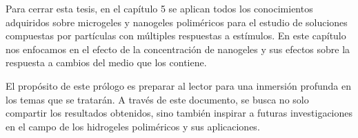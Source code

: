 Para cerrar esta tesis, en el cap\'itulo 5 se aplican todos los conocimientos adquiridos sobre microgeles y nanogeles polim\'ericos para el estudio de soluciones compuestas por part\'iculas con m\'ultiples respuestas a est\'imulos. En este cap\'itulo nos enfocamos en el efecto de la concentraci\'on de nanogeles y sus efectos sobre la respuesta a cambios del medio que los contiene.

El prop\'osito de este pr\'ologo es preparar al lector para una inmersi\'on profunda en los temas que se tratar\'an. A trav\'es de este documento, se busca no solo compartir los resultados obtenidos, sino tambi\'en inspirar a futuras investigaciones en el campo de los hidrogeles polim\'ericos y sus aplicaciones.




